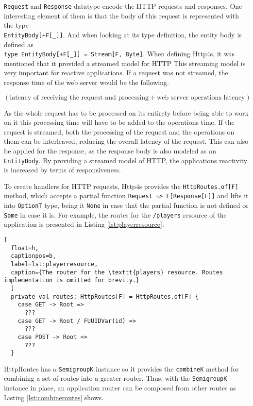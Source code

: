 \documentclass[../main.tex]{subfiles}
\begin{document}
\texttt{Request} and \texttt{Response} datatype encode the HTTP requests and
responses. One interesting element of them is that the body of this request is
represented with the type \\ \texttt{EntityBody[+F[\_]]}. And when looking at its
type definition, the entity body is defined as\\
\lstinline{type EntityBody[+F[_]] = Stream[F, Byte]}.
When defining Http4s, it was mentioned that it provided a streamed model for
HTTP This streaming model is very important for reactive applications. If a
request was not streamed, the response time of the web
server would be the following.

\begin{center}
$(\text{latency of receiving the request and processing} +
\text{web server operations latency})$
\end{center}

As the whole request has to be processed on its
entirety before being able to work on it this processing time will have to be added to the operations time. If the request is streamed, both
the processing of the request and the operations on them can be interleaved,
reducing the overall latency of the request. This can also be applied for the
response, as the response body is also modeled as an \texttt{EntityBody}. By
providing a streamed model of HTTP, the applications reactivity is increased by
terms of responsiveness.

To create handlers for HTTP requests, Http4s provides the \texttt{HttpRoutes.of[F]} method, which accepts a partial
function \texttt{Request => F[Response[F]]} and lifts it into \texttt{OptionT} type,
being it \texttt{None} in case that the partial function is not defined or \texttt{Some} in case
it is. For example, the routes for the \texttt{/players} resource of the
application is presented in Listing \ref{lst:playerresource}.

\begin{lstlisting}[
  float=h,
  captionpos=b,
  label=lst:playerresource,
  caption={The router for the \texttt{players} resource. Routes implementation is omitted for brevity.}
  ]
  private val routes: HttpRoutes[F] = HttpRoutes.of[F] {
    case GET -> Root =>
      ???
    case GET -> Root / FUUIDVar(id) =>
      ???
    case POST -> Root =>
      ???
  }
\end{lstlisting}

HttpRoutes has a \texttt{SemigroupK} instance so it provides the \texttt{combineK} method
for combining a set of routes into a greater router. Thus, with the \texttt{SemigroupK}
instance in place, an application router can be composed from other routes as Listing
\ref{lst:combineroutes} shows.
\end{document}
